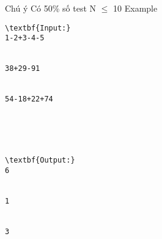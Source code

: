 Chú ý
Có 50\% số test N  $\le$  10
Example
\begin{verbatim}
\textbf{Input:}
1-2+3-4-5


38+29-91


54-18+22+74





\textbf{Output:}
6


1


3 \end{verbatim}